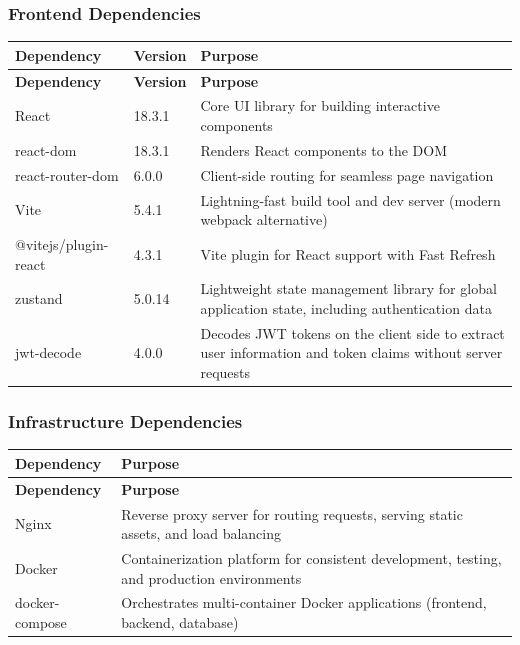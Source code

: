 \documentclass[12pt, a4paper]{article}
\begin{document}
\subsubsection{Frontend Dependencies}

\begin{longtable}{L{3.6cm} C{2.0cm} L{8.8cm}}
  \color{white}\bfseries Dependency &
  \color{white}\bfseries Version &
  \color{white}\bfseries Purpose \\
  \endfirsthead
  \color{white}\bfseries Dependency &
  \color{white}\bfseries Version &
  \color{white}\bfseries Purpose \\
  \endhead
  React & 18.3.1 & Core UI library for building interactive components \\
  react-dom & 18.3.1 & Renders React components to the DOM \\
  react-router-dom & 6.0.0 & Client-side routing for seamless page navigation \\
  Vite & 5.4.1 & Lightning-fast build tool and dev server (modern webpack alternative) \\
  @vitejs/plugin-react & 4.3.1 & Vite plugin for React support with Fast Refresh \\
  zustand & 5.0.14 & Lightweight state management library for global application state, including authentication data \\
  jwt-decode & 4.0.0 & Decodes JWT tokens on the client side to extract user information and token claims without server requests \\
\end{longtable}
\subsubsection{Infrastructure Dependencies}

\begin{longtable}{L{3.6cm} L{10.8cm}}
  \color{white}\bfseries Dependency &
  \color{white}\bfseries Purpose \\
  \endfirsthead
  \color{white}\bfseries Dependency &
  \color{white}\bfseries Purpose \\
  \endhead
  Nginx & Reverse proxy server for routing requests, serving static assets, and load balancing \\
  Docker & Containerization platform for consistent development, testing, and production environments \\
  docker-compose & Orchestrates multi-container Docker applications (frontend, backend, database) \\
\end{longtable}
\end{document}
